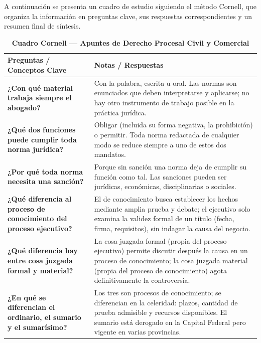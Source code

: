 \documentclass[12pt,oneside]{book}
\begin{document}
A continuación se presenta un cuadro de estudio siguiendo el método Cornell, que organiza la información en preguntas clave, sus respuestas correspondientes y un resumen final de síntesis.

\begin{table}[H]
\centering
\caption*{\textbf{Cuadro Cornell --- Apuntes de Derecho Procesal Civil y Comercial}}
\vspace{0.3cm}
\begin{tabularx}{\textwidth}{
    >{\raggedright\arraybackslash}p{}
    >{\raggedright\arraybackslash}X
}
\toprule
\textbf{Preguntas / Conceptos Clave} & \textbf{Notas / Respuestas} \\
\midrule

\textbf{¿Con qué material trabaja siempre el abogado?} & 
Con la palabra, escrita u oral. Las normas son enunciados que deben interpretarse y aplicarse; no hay otro instrumento de trabajo posible en la práctica jurídica. \\

\textbf{¿Qué dos funciones puede cumplir toda norma jurídica?} & 
Obligar (incluida su forma negativa, la prohibición) o permitir. Toda norma redactada de cualquier modo se reduce siempre a uno de estos dos mandatos. \\

\textbf{¿Por qué toda norma necesita una sanción?} & 
Porque sin sanción una norma deja de cumplir su función como tal. Las sanciones pueden ser jurídicas, económicas, disciplinarias o sociales. \\

\textbf{¿Qué diferencia al proceso de conocimiento del proceso ejecutivo?} & 
El de conocimiento busca establecer los hechos mediante amplia prueba y debate; el ejecutivo solo examina la validez formal de un título (fecha, firma, requisitos), sin indagar la causa del negocio. \\

\textbf{¿Qué diferencia hay entre cosa juzgada formal y material?} & 
La cosa juzgada formal (propia del proceso ejecutivo) permite discutir después la causa en un proceso de conocimiento; la cosa juzgada material (propia del proceso de conocimiento) agota definitivamente la controversia. \\

\textbf{¿En qué se diferencian el ordinario, el sumario y el sumarísimo?} & 
Los tres son procesos de conocimiento; se diferencian en la celeridad: plazos, cantidad de prueba admisible y recursos disponibles. El sumario está derogado en la Capital Federal pero vigente en varias provincias. \\


\end{tabularx}
\end{table}
\end{document}
